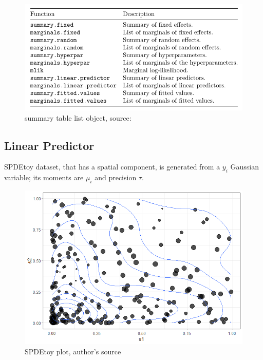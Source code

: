 \documentclass[
  12pt,
  a4paper,
  oneside]{book}
\begin{document}
\begin{figure}
\centering
\includegraphics{images/summarytable.PNG}
\caption{summary table list object, source: \citet{Krainski-Rubio}}
\end{figure}

\hypertarget{example}{%
\subsection{Linear Predictor}\label{example}}

SPDEtoy dataset, that has a spatial component, is generated from a \(y_{i}\) Gaussian variable; its moments are \(\mu_{i}\) and precision \(\tau\).

\begin{figure}
\centering
\includegraphics{images/cotour_toy.png}
\caption{SPDEtoy plot, author's source}
\end{figure}
\end{document}
